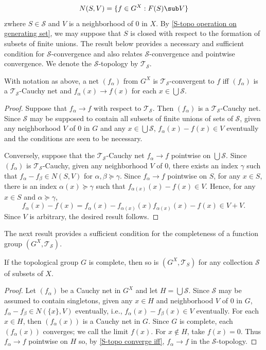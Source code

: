 \[N(S,V)=\{f\in G^X:F(S)\sub V\}\]
zwhere $S\in\mathcal{S}$ and $V$ is a neighborhood of $0$ in $X$. By \cref{S-topo operation on generating set}, we may suppose that $S$ is closed with respect to the formation of subsets of finite unions. The result below provides a necessary and sufficient condition for $\mathcal{S}$-convergence and also relates $\mathcal{S}$-convergence and pointwise convergence. We denote the $\mathcal{S}$-topology by $\mathcal{T}_{\mathcal{S}}$.
\begin{proposition}\label{S-topo converge iff}
With notation as above, a net $(f_\alpha)$ from $G^X$ is $\mathcal{T}_{\mathcal{S}}$-convergent to $f$ iff $(f_\alpha)$ is a $\mathcal{T}_{\mathcal{S}}$-Cauchy net and $f_\alpha(x)\to f(x)$ for each $x\in\bigcup\mathcal{S}$.
\end{proposition}
\begin{proof}
Suppose that $f_\alpha\to f$ with respect to $\mathcal{T}_{\mathcal{S}}$. Then $(f_\alpha)$ is a $\mathcal{T}_{\mathcal{S}}$-Cauchy net. Since $\mathcal{S}$ may be supposed to contain all subsets of finite unions of sets of $\mathcal{S}$, given any neighborhood $V$ of $0$ in $G$ and any $x\in\bigcup\mathcal{S}$, $f_\alpha(x)-f(x)\in V$ eventually and the conditions are seen to be necessary.\par
Conversely, suppose that the $\mathcal{T}_{\mathcal{S}}$-Cauchy net $f_\alpha\to f$ pointwise on $\bigcup\mathcal{S}$. Since $(f_\alpha)$ is $\mathcal{T}_{\mathcal{S}}$-Cauchy, given any neighborhood $V$ of $0$, there exists an index $\gamma$ such that $f_\alpha-f_\beta\in N(S,V)$ for $\alpha,\beta\succeq\gamma$. Since $f_\alpha\to f$ pointwise on $S$, for any $x\in S$, there is an index $\alpha(x)\succeq\gamma$ such that $f_{\alpha(x)}(x)-f(x)\in V$. Hence, for any $x\in S$ and $\alpha\succeq\gamma$,
\[f_\alpha(x)-f(x)=f_\alpha(x)-f_{\alpha(x)}(x)f_{\alpha(x)}(x)-f(x)\in V+V.\]
Since $V$ is arbitrary, the desired result follows.
\end{proof}
The next result provides a sufficient condition for the completeness of a function group $(G^X,\mathcal{T}_{\mathcal{S}})$.
\begin{proposition}\label{S-topo complete if group is}
If the topological group $G$ is complete, then so is $(G^X,\mathcal{T}_S)$ for any collection $\mathcal{S}$ of subsets of $X$.
\end{proposition}
\begin{proof}
Let $(f_\alpha)$ be a Cauchy net in $G^X$ and let $H=\bigcup\mathcal{S}$. Since $\mathcal{S}$ may be assumed to contain singletons, given any $x\in H$ and neighborhood $V$ of $0$ in $G$, $f_\alpha-f_\beta\in N(\{x\},V)$ eventually, i.e., $f_\alpha(x)-f_\beta(x)\in V$ eventually. For each $x\in H$, then $(f_\alpha(x))$ is a Cauchy net in $G$. Since $G$ is complete, each $(f_\alpha(x))$ converges; we call the limit $f(x)$. For $x\notin H$, take $f(x)=0$. Thus $f_\alpha\to f$ pointwise on $H$ so, by \cref{S-topo converge iff}, $f_\alpha\to f$ in the $\mathcal{S}$-topology.
\end{proof}
